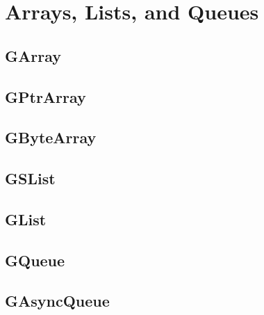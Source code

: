 \chapter{Arrays, Lists, and Queues}

\section{GArray}

\section{GPtrArray}

\section{GByteArray}

\section{GSList}

\section{GList}

\section{GQueue}

\section{GAsyncQueue}
